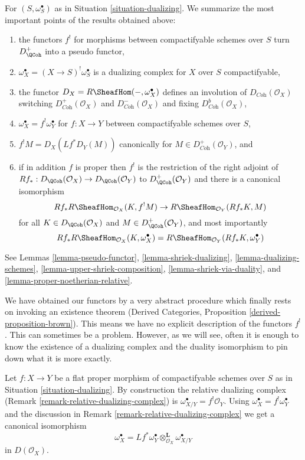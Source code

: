 \noindent
For $(S, \omega_S^\bullet)$ as in Situation \ref{situation-dualizing}.
We summarize the most important points of the results obtained above:
\begin{enumerate}
\item the functors $f^!$ for morphisms between compactifyable
schemes over $S$ turn $D_\QCoh^+$ into a pseudo functor,
\item $\omega_X^\bullet = (X \to S)^!\omega_S^\bullet$
is a dualizing complex for $X$ over $S$ compactifyable,
\item the functor $D_X = R\SheafHom(-, \omega_X^\bullet)$
defines an involution of $D_{\textit{Coh}}(\mathcal{O}_X)$
switching $D_{\textit{Coh}}^+(\mathcal{O}_X)$ and
$D_{\textit{Coh}}^-(\mathcal{O}_X)$ and fixing
$D_{\textit{Coh}}^b(\mathcal{O}_X)$,
\item $\omega_X^\bullet = f^!\omega_Y^\bullet$ for $f : X \to Y$
between compactifyable schemes over $S$,
\item $f^!M = D_X(Lf^*D_Y(M))$ canonically for
$M \in D_{\textit{Coh}}^+(\mathcal{O}_Y)$, and
\item if in addition $f$ is proper then $f^!$ is the restriction
of the right adjoint of
$Rf_* : D_\QCoh(\mathcal{O}_X) \to D_\QCoh(\mathcal{O}_Y)$
to $D_\QCoh^+(\mathcal{O}_Y)$ and there is a canonical isomorphism
$$
Rf_*R\SheafHom_{\mathcal{O}_X}(K, f^!M)
\to
R\SheafHom_{\mathcal{O}_Y}(Rf_*K, M)
$$
for all $K \in D_\QCoh(\mathcal{O}_X)$ and $M \in D_\QCoh^+(\mathcal{O}_Y)$,
and most importantly
$$
Rf_*R\SheafHom_{\mathcal{O}_X}(K, \omega_X^\bullet) =
R\SheafHom_{\mathcal{O}_Y}(Rf_*K, \omega_Y^\bullet)
$$
\end{enumerate}
See Lemmas
\ref{lemma-pseudo-functor},
\ref{lemma-shriek-dualizing},
\ref{lemma-dualizing-schemes},
\ref{lemma-upper-shriek-composition},
\ref{lemma-shriek-via-duality}, and
\ref{lemma-proper-noetherian-relative}. 

\medskip\noindent
We have obtained our functors by a very abstract procedure
which finally rests on invoking an existence theorem
(Derived Categories, Proposition \ref{derived-proposition-brown}).
This means we have no explicit description of the functors $f^!$.
This can sometimes be a problem. However, as we will see,
often it is enough to know the existence of a dualizing complex
and the duality isomorphism to pin down what it is more exactly.

\begin{remark}
\label{remark-relative-dualizing-complex-shriek}
Let $f : X \to Y$ be a flat proper morphism of compactifyable
schemes over $S$ as in Situation \ref{situation-dualizing}.
By construction the relative dualizing complex
(Remark \ref{remark-relative-dualizing-complex}) is
$\omega_{X/Y}^\bullet = f^!\mathcal{O}_Y$.
Using $\omega_X^\bullet = f^!\omega_Y^\bullet$ and the discussion in
Remark \ref{remark-relative-dualizing-complex}
we get a canonical isomorphism
$$
\omega_X^\bullet =
Lf^*\omega_Y^\bullet \otimes_{\mathcal{O}_X}^\mathbf{L} \omega_{X/Y}^\bullet
$$
in $D(\mathcal{O}_X)$.
\end{remark}







